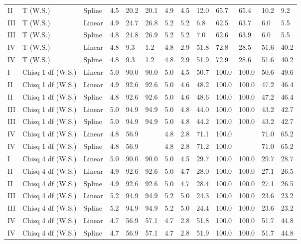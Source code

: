 \documentclass{article}\usepackage[]{graphicx}\usepackage[]{color}
\begin{document}
\begin{table}[ht]
\begin{tabular}{lll|lllll|lllll}
  II & T (W.S.) & Spline & 4.5 & 20.2 & 20.1 & 4.9 & 4.5 & 12.0 & 65.7 & 65.4 & 10.2 & 9.2 \\ 
  III & T (W.S.) & Linear & 4.9 & 24.7 & 26.8 & 5.2 & 5.2 & 6.8 & 62.5 & 63.7 & 6.0 & 5.5 \\ 
  III & T (W.S.) & Spline & 4.8 & 24.8 & 26.9 & 5.2 & 5.2 & 7.0 & 62.6 & 63.9 & 6.0 & 5.5 \\ 
  IV & T (W.S.) & Linear & 4.8 & 9.3 & 1.2 & 4.8 & 2.9 & 51.8 & 72.8 & 28.5 & 51.6 & 40.2 \\ 
  IV & T (W.S.) & Spline & 4.8 & 9.3 & 1.2 & 4.8 & 2.9 & 51.9 & 72.9 & 28.6 & 51.6 & 40.2 \\ 
   \hline
I & Chisq 1 df (W.S.) & Linear & 5.0 & 90.0 & 90.0 & 5.0 & 4.5 & 50.7 & 100.0 & 100.0 & 50.6 & 49.6 \\ 
  II & Chisq 1 df (W.S.) & Linear & 4.9 & 92.6 & 92.6 & 5.0 & 4.6 & 48.2 & 100.0 & 100.0 & 47.2 & 46.4 \\ 
  II & Chisq 1 df (W.S.) & Spline & 4.8 & 92.6 & 92.6 & 5.0 & 4.6 & 48.6 & 100.0 & 100.0 & 47.2 & 46.4 \\ 
  III & Chisq 1 df (W.S.) & Linear & 5.0 & 94.9 & 94.9 & 5.0 & 4.8 & 44.0 & 100.0 & 100.0 & 43.2 & 42.7 \\ 
  III & Chisq 1 df (W.S.) & Spline & 5.0 & 94.9 & 94.9 & 5.0 & 4.8 & 44.2 & 100.0 & 100.0 & 43.2 & 42.7 \\ 
  IV & Chisq 1 df (W.S.) & Linear & 4.8 & 56.9 &  & 4.8 & 2.8 & 71.1 & 100.0 &  & 71.0 & 65.2 \\ 
  IV & Chisq 1 df (W.S.) & Spline & 4.8 & 56.9 &  & 4.8 & 2.8 & 71.2 & 100.0 &  & 71.0 & 65.2 \\ 
   \hline
I & Chisq 4 df (W.S.) & Linear & 5.0 & 90.0 & 90.0 & 5.0 & 4.5 & 29.7 & 100.0 & 100.0 & 29.7 & 28.7 \\ 
  II & Chisq 4 df (W.S.) & Linear & 4.9 & 92.6 & 92.6 & 5.0 & 4.7 & 28.0 & 100.0 & 100.0 & 27.1 & 26.5 \\ 
  II & Chisq 4 df (W.S.) & Spline & 4.9 & 92.6 & 92.6 & 5.0 & 4.7 & 28.4 & 100.0 & 100.0 & 27.1 & 26.5 \\ 
  III & Chisq 4 df (W.S.) & Linear & 5.2 & 94.9 & 94.9 & 5.2 & 5.0 & 24.3 & 100.0 & 100.0 & 23.6 & 23.2 \\ 
  III & Chisq 4 df (W.S.) & Spline & 5.2 & 94.9 & 94.9 & 5.2 & 5.0 & 24.4 & 100.0 & 100.0 & 23.6 & 23.2 \\ 
  IV & Chisq 4 df (W.S.) & Linear & 4.7 & 56.9 & 57.1 & 4.7 & 2.8 & 51.8 & 100.0 & 100.0 & 51.7 & 44.8 \\ 
  IV & Chisq 4 df (W.S.) & Spline & 4.7 & 56.9 & 57.1 & 4.7 & 2.8 & 51.9 & 100.0 & 100.0 & 51.7 & 44.8 \\ 
   \hline
\end{tabular}
\end{table}
\end{document}
